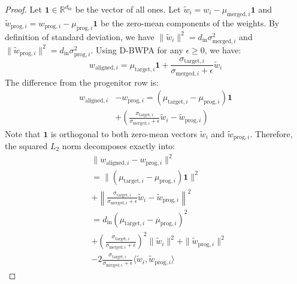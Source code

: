 \documentclass{article}
\theoremstyle{plain}
\theoremstyle{definition}
\theoremstyle{remark}
\begin{document}
\begin{proof}
Let $\mathbf{1} \in \mathbb{R}^{d_{\mathrm{in}}}$ be the vector of all ones. Let $\tilde{w}_i = w_i - \mu_{\mathrm{merged}, i} \mathbf{1}$ and $\tilde{w}_{\mathrm{prog}, i} = w_{\mathrm{prog}, i} - \mu_{\mathrm{prog}, i} \mathbf{1}$ be the zero-mean components of the weights. By definition of standard deviation, we have $\|\tilde{w}_i\|^2 = d_{\mathrm{in}} \sigma_{\mathrm{merged}, i}^2$ and $\|\tilde{w}_{\mathrm{prog}, i}\|^2 = d_{\mathrm{in}} \sigma_{\mathrm{prog}, i}^2$.
Using D-BWPA for any $\epsilon \ge 0$, we have:
\begin{equation}
  w_{\mathrm{aligned}, i} = \mu_{\mathrm{target}, i} \mathbf{1} + \frac{\sigma_{\mathrm{target}, i}}{\sigma_{\mathrm{merged}, i} + \epsilon} \tilde{w}_i
\end{equation}
The difference from the progenitor row is:
\begin{equation}
\begin{split}
  w_{\mathrm{aligned}, i} &- w_{\mathrm{prog}, i} = (\mu_{\mathrm{target}, i} - \mu_{\mathrm{prog}, i}) \mathbf{1} \\
  &+ \left( \frac{\sigma_{\mathrm{target}, i}}{\sigma_{\mathrm{merged}, i} + \epsilon} \tilde{w}_i - \tilde{w}_{\mathrm{prog}, i} \right)
\end{split}
\end{equation}
Note that $\mathbf{1}$ is orthogonal to both zero-mean vectors $\tilde{w}_i$ and $\tilde{w}_{\mathrm{prog}, i}$. Therefore, the squared $L_2$ norm decomposes exactly into:
\begin{equation}
\begin{split}
  &\|w_{\mathrm{aligned}, i} - w_{\mathrm{prog}, i}\|^2 \\
  &= \|(\mu_{\mathrm{target}, i} - \mu_{\mathrm{prog}, i}) \mathbf{1}\|^2 \\
  &+ \left\| \frac{\sigma_{\mathrm{target}, i}}{\sigma_{\mathrm{merged}, i} + \epsilon} \tilde{w}_i - \tilde{w}_{\mathrm{prog}, i} \right\|^2 \\
  &= d_{\mathrm{in}} (\mu_{\mathrm{target}, i} - \mu_{\mathrm{prog}, i})^2 \\
  &+ \left( \frac{\sigma_{\mathrm{target}, i}}{\sigma_{\mathrm{merged}, i} + \epsilon} \right)^2 \|\tilde{w}_i\|^2 + \|\tilde{w}_{\mathrm{prog}, i}\|^2 \\
  &- 2 \frac{\sigma_{\mathrm{target}, i}}{\sigma_{\mathrm{merged}, i} + \epsilon} \langle \tilde{w}_i, \tilde{w}_{\mathrm{prog}, i} \rangle
\end{split}
\end{equation}

\end{proof}
\end{document}
